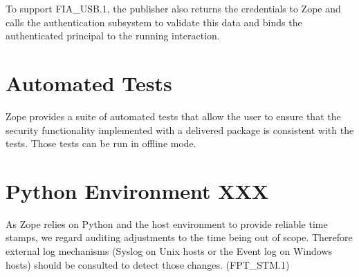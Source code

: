 \documentclass[12pt,english]{scrbook}
\begin{document}
To support FIA{\_}USB.1, the publisher also returns the credentials to Zope and
calls the authentication subsystem to validate this data and binds the
authenticated principal to the running interaction.





\section{Automated Tests}

Zope provides a suite of automated tests that allow the user to ensure that the
security functionality implemented with a delivered package is consistent with
the tests. Those tests can be run in offline mode.





\section{Python Environment XXX}

As Zope relies on Python and the host environment to provide reliable time
stamps, we regard auditing adjustments to the time being out of scope.
Therefore external log mechanisms (Syslog on Unix hosts or the Event log on
Windows hosts) should be consulted to detect those changes. (FPT{\_}STM.1)


\end{document}
